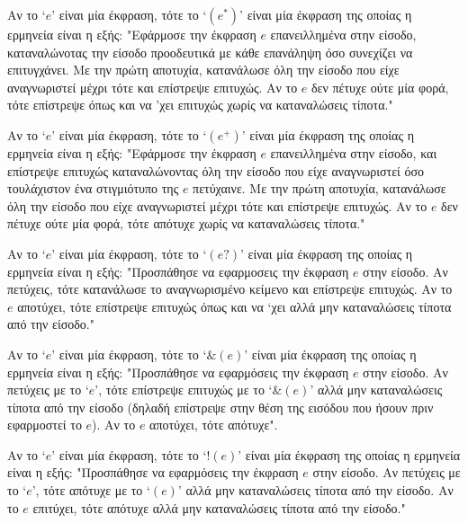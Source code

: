 \documentclass[diploma]{softlab-thesis}
\begin{document}
\begin{description}[font=$\bullet$\scshape\bfseries]
   \item[ Άπληστη Επανάληψη:]
	 Αν το `$e$' είναι μία έκφραση, τότε το `$(e^*)$' είναι μία έκφραση της οποίας η ερμηνεία είναι η εξής:
	 "Εφάρμοσε την έκφραση $e$ επανειλλημένα στην είσοδο, καταναλώνοτας την είσοδο προοδευτικά με κάθε επανάληψη όσο συνεχίζει να επιτυγχάνει.
	 Με την πρώτη αποτυχία, κατανάλωσε όλη την είσοδο που είχε αναγνωριστεί μέχρι τότε και επίστρεψε επιτυχώς.
	 Αν το $e$ δεν πέτυχε ούτε μία φορά, τότε επίστρεψε όπως και να 'χει επιτυχώς χωρίς να καταναλώσεις τίποτα."

   \item[ Άπληστη Θετική Επανάληψη:] %
	 Αν το `$e$' είναι μία έκφραση, τότε το `$(e^+)$' είναι μία έκφραση της οποίας η ερμηνεία είναι η εξής:
	 "Εφάρμοσε την έκφραση $e$ επανειλλημένα στην είσοδο, 
	 και επίστρεψε επιτυχώς καταναλώνοντας όλη την είσοδο που είχε αναγνωριστεί όσο τουλάχιστον ένα στιγμιότυπο της $e$ πετύχαινε.
	 Με την πρώτη αποτυχία, κατανάλωσε όλη την είσοδο που είχε αναγνωριστεί μέχρι τότε και επίστρεψε επιτυχώς.
	 Αν το $e$ δεν πέτυχε ούτε μία φορά, τότε απότυχε χωρίς να καταναλώσεις τίποτα."

   \item[ Προαιρετικό:] 
	 Αν το `$e$' είναι μία έκφραση, τότε το `$(e?)$' είναι μία έκφραση της οποίας η ερμηνεία είναι η εξής:
	 "Προσπάθησε να εφαρμοσεις την έκφραση $e$ στην είσοδο.
	 Αν πετύχεις, τότε κατανάλωσε το αναγνωρισμένο κείμενο και επίστρεψε επιτυχώς.
	 Αν το $e$ αποτύχει, τότε επίστρεψε επιτυχώς όπως και να `χει αλλά μην καταναλώσεις τίποτα από την είσοδο."

   \item[ Ακουλουθείται-Από Κατηγόρημα:]
	 Αν το `$e$' είναι μία έκφραση, τότε το `$\&(e)$' είναι μία έκφραση της οποίας η ερμηνεία είναι η εξής:
	 "Προσπάθησε να εφαρμόσεις την έκφραση $e$ στην είσοδο.
	 Αν πετύχεις με το `$e$', τότε επίστρεψε επιτυχώς με το `$\&(e)$' αλλά μην καταναλώσεις τίποτα από την είσοδο 
	 (δηλαδή επίστρεψε στην θέση της εισόδου που ήσουν πριν εφαρμοστεί το $e$).
	 Αν το $e$ αποτύχει, τότε απότυχε".

   \item[ Δεν-Ακολουθείται-Από Κατηγόρημα:]
	 Αν το `$e$' είναι μία έκφραση, τότε το `$!(e)$' είναι μία έκφραση της οποίας η ερμηνεία είναι η εξής:
	 "Προσπάθησε να εφαρμόσεις την έκφραση $e$ στην είσοδο.
	 Αν πετύχεις με το `$e$', τότε απότυχε με το `$\!(e)$' αλλά μην καταναλώσεις τίποτα από την είσοδο.
	 Αν το $e$ επιτύχει, τότε απότυχε αλλά μην καταναλώσεις τίποτα από την είσοδο."

 \end{description}
\end{document}
